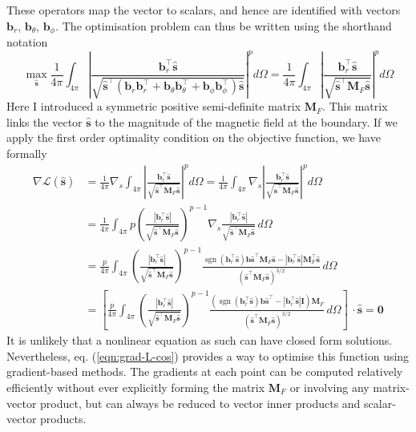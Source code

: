 \documentclass[a4paper, 11pt]{article}
\DeclareMathOperator{\sgn}{sgn}
\begin{document}
These operators map the vector to scalars, and hence are identified with vectors $\mathbf{b}_r$, $\mathbf{b}_\theta$, $\mathbf{b}_\phi$. The optimisation problem can thus be written using the shorthand notation
\begin{equation}
    \max_{\hat{\mathbf{s}}} \frac{1}{4\pi} \int_{4\pi} \left|\frac{\mathbf{b}_r^\top \hat{\mathbf{s}}}{\sqrt{\hat{\mathbf{s}}^\top (\mathbf{b}_r \mathbf{b}_r^\top + \mathbf{b}_\theta \mathbf{b}_\theta^\top + \mathbf{b}_
    \phi \mathbf{b}_\phi^\top) \hat{\mathbf{s}}}}\right|^p d\Omega = \frac{1}{4\pi} \int_{4\pi} \left|\frac{\mathbf{b}_r^\top \hat{\mathbf{s}}}{\sqrt{\hat{\mathbf{s}}^\top \mathbf{M}_F \hat{\mathbf{s}}}}\right|^p d\Omega
\end{equation}
Here I introduced a symmetric positive semi-definite matrix $\mathbf{M}_F$. This matrix links the vector $\hat{\mathbf{s}}$ to the magnitude of the magnetic field at the boundary. If we apply the first order optimality condition on the objective function, we have formally
\begin{equation}\label{eqn:grad-L-cos}
\begin{aligned}
    \nabla \mathcal{L}(\hat{\mathbf{s}}) &= \frac{1}{4\pi} \nabla_s \int_{4\pi} \left|\frac{\mathbf{b}_r^\top \hat{\mathbf{s}}}{\sqrt{\hat{\mathbf{s}}^\top \mathbf{M}_F \hat{\mathbf{s}}}}\right|^p d\Omega = \frac{1}{4\pi} \int_{4\pi} \nabla_s \left|\frac{\mathbf{b}_r^\top \hat{\mathbf{s}}}{\sqrt{\hat{\mathbf{s}}^\top \mathbf{M}_F \hat{\mathbf{s}}}}\right|^p d\Omega \\ 
    &= \frac{1}{4\pi} \int_{4\pi} p \left(\frac{|\mathbf{b}_r^\top \hat{\mathbf{s}}|}{\sqrt{\hat{\mathbf{s}}^\top \mathbf{M}_F \hat{\mathbf{s}}}}\right)^{p-1} \nabla_s \frac{|\mathbf{b}_r^\top \hat{\mathbf{s}}|}{\sqrt{\hat{\mathbf{s}}^\top \mathbf{M}_F \hat{\mathbf{s}}}} \, d\Omega \\ 
    &= \frac{p}{4\pi} \int_{4\pi} \left(\frac{|\mathbf{b}_r^\top \hat{\mathbf{s}}|}{\sqrt{\hat{\mathbf{s}}^\top \mathbf{M}_F \hat{\mathbf{s}}}}\right)^{p-1} \frac{\sgn(\mathbf{b}_r^\top \hat{\mathbf{s}}) \mathbf{b} \hat{\mathbf{s}}^\top \mathbf{M}_F \hat{\mathbf{s}} - |\mathbf{b}_r^\top \hat{\mathbf{s}}| \mathbf{M}_F^\top \hat{\mathbf{s}}}{(\hat{\mathbf{s}}^\top \mathbf{M}_F \hat{\mathbf{s}})^{3/2}} \, d\Omega \\ 
    &= \left[\frac{p}{4\pi} \int_{4\pi} \left(\frac{|\mathbf{b}_r^\top \hat{\mathbf{s}}|}{\sqrt{\hat{\mathbf{s}}^\top \mathbf{M}_F \hat{\mathbf{s}}}}\right)^{p-1} \frac{\left(\sgn(\mathbf{b}_r^\top \hat{\mathbf{s}}) \mathbf{b} \hat{\mathbf{s}}^\top - |\mathbf{b}_r^\top \hat{\mathbf{s}}| \mathbf{I}\right) \mathbf{M}_F}{(\hat{\mathbf{s}}^\top \mathbf{M}_F \hat{\mathbf{s}})^{3/2}} \, d\Omega \right]\, \cdot \hat{\mathbf{s}} = \mathbf{0}
\end{aligned}
\end{equation}
It is unlikely that a nonlinear equation as such can have closed form solutions. Nevertheless, eq. (\ref{eqn:grad-L-cos}) provides a way to optimise this function using gradient-based methods. The gradients at each point can be computed relatively efficiently without ever explicitly forming the matrix $\mathbf{M}_F$ or involving any matrix-vector product, but can always be reduced to vector inner products and scalar-vector products.
\end{document}
